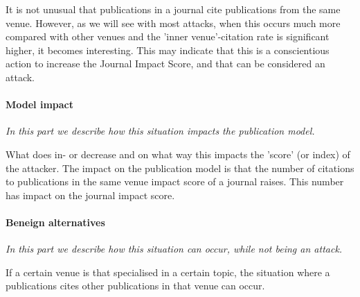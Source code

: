 \documentclass{ou-report}
\newcommand{\outline}[1]{{\color{blue} #1}}
\begin{document}
It is not unusual that 
publications in a journal cite publications from the same venue. However, as we 
will see with most attacks, when this occurs much more 
compared with other venues and the 'inner venue'-citation rate is significant higher, it becomes 
interesting. This may indicate that this is a conscientious action to increase
the Journal Impact Score, and that can be considered an attack.

\paragraph{Model impact}
\textit{In this part we describe how this situation impacts the publication 
model.}

What does in- or decrease and on what way this impacts the 'score' (or index) 
of the attacker.
The impact on the publication model is that the number of citations to 
publications in the same venue impact score of a journal raises. This number has
impact on the journal impact score.

\paragraph{Beneign alternatives}
\textit{In this part we describe how this situation can occur, while not being
an attack.} 

If a certain venue is that specialised in a certain topic, the 
situation where a publications cites other publications in that venue can occur.







\end{document}
